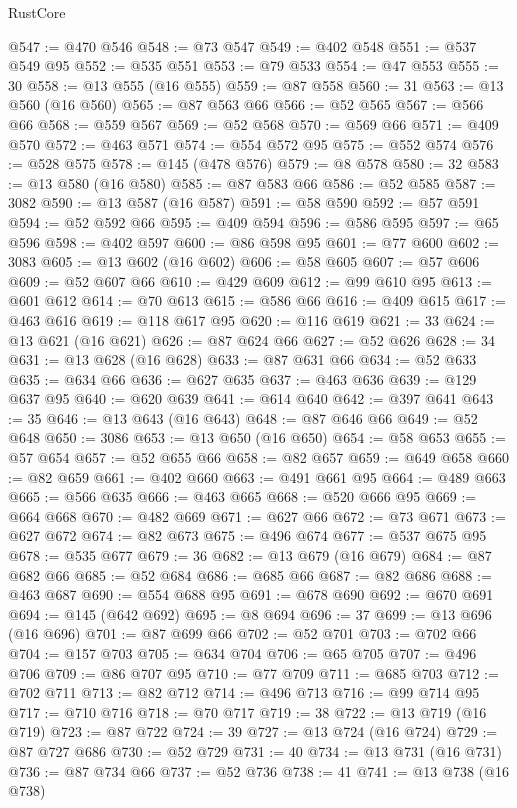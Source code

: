 \begin{lexlean}{RustCore}
\begin{coremodule}
@547 := @470 @546
@548 := @73 @547
@549 := @402 @548
@551 := @537 @549 @95
@552 := @535 @551
@553 := @79 @533
@554 := @47 @553
@555 := 30
@558 := @13 @555 (@16 @555)
@559 := @87 @558
@560 := 31
@563 := @13 @560 (@16 @560)
@565 := @87 @563 @66
@566 := @52 @565
@567 := @566 @66
@568 := @559 @567
@569 := @52 @568
@570 := @569 @66
@571 := @409 @570
@572 := @463 @571
@574 := @554 @572 @95
@575 := @552 @574
@576 := @528 @575
@578 := @145 (@478 @576)
@579 := @8 @578
@580 := 32
@583 := @13 @580 (@16 @580)
@585 := @87 @583 @66
@586 := @52 @585
@587 := 3082
@590 := @13 @587 (@16 @587)
@591 := @58 @590
@592 := @57 @591
@594 := @52 @592 @66
@595 := @409 @594
@596 := @586 @595
@597 := @65 @596
@598 := @402 @597
@600 := @86 @598 @95
@601 := @77 @600
@602 := 3083
@605 := @13 @602 (@16 @602)
@606 := @58 @605
@607 := @57 @606
@609 := @52 @607 @66
@610 := @429 @609
@612 := @99 @610 @95
@613 := @601 @612
@614 := @70 @613
@615 := @586 @66
@616 := @409 @615
@617 := @463 @616
@619 := @118 @617 @95
@620 := @116 @619
@621 := 33
@624 := @13 @621 (@16 @621)
@626 := @87 @624 @66
@627 := @52 @626
@628 := 34
@631 := @13 @628 (@16 @628)
@633 := @87 @631 @66
@634 := @52 @633
@635 := @634 @66
@636 := @627 @635
@637 := @463 @636
@639 := @129 @637 @95
@640 := @620 @639
@641 := @614 @640
@642 := @397 @641
@643 := 35
@646 := @13 @643 (@16 @643)
@648 := @87 @646 @66
@649 := @52 @648
@650 := 3086
@653 := @13 @650 (@16 @650)
@654 := @58 @653
@655 := @57 @654
@657 := @52 @655 @66
@658 := @82 @657
@659 := @649 @658
@660 := @82 @659
@661 := @402 @660
@663 := @491 @661 @95
@664 := @489 @663
@665 := @566 @635
@666 := @463 @665
@668 := @520 @666 @95
@669 := @664 @668
@670 := @482 @669
@671 := @627 @66
@672 := @73 @671
@673 := @627 @672
@674 := @82 @673
@675 := @496 @674
@677 := @537 @675 @95
@678 := @535 @677
@679 := 36
@682 := @13 @679 (@16 @679)
@684 := @87 @682 @66
@685 := @52 @684
@686 := @685 @66
@687 := @82 @686
@688 := @463 @687
@690 := @554 @688 @95
@691 := @678 @690
@692 := @670 @691
@694 := @145 (@642 @692)
@695 := @8 @694
@696 := 37
@699 := @13 @696 (@16 @696)
@701 := @87 @699 @66
@702 := @52 @701
@703 := @702 @66
@704 := @157 @703
@705 := @634 @704
@706 := @65 @705
@707 := @496 @706
@709 := @86 @707 @95
@710 := @77 @709
@711 := @685 @703
@712 := @702 @711
@713 := @82 @712
@714 := @496 @713
@716 := @99 @714 @95
@717 := @710 @716
@718 := @70 @717
@719 := 38
@722 := @13 @719 (@16 @719)
@723 := @87 @722
@724 := 39
@727 := @13 @724 (@16 @724)
@729 := @87 @727 @686
@730 := @52 @729
@731 := 40
@734 := @13 @731 (@16 @731)
@736 := @87 @734 @66
@737 := @52 @736
@738 := 41
@741 := @13 @738 (@16 @738)

\end{coremodule}
\end{lexlean}

